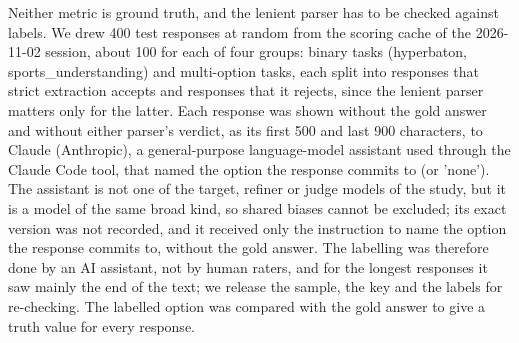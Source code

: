 \documentclass{ieeeaccess}
\begin{document}
Neither metric is ground truth, and the lenient parser has to be checked against labels. We drew 400 test responses at random from the scoring cache of the 2026-11-02 session, about 100 for each of four groups: binary tasks (hyperbaton, sports\_\allowbreak{}understanding) and multi-option tasks, each split into responses that strict extraction accepts and responses that it rejects, since the lenient parser matters only for the latter. Each response was shown without the gold answer and without either parser's verdict, as its first 500 and last 900 characters, to Claude (Anthropic), a general-purpose language-model assistant used through the Claude Code tool, that named the option the response commits to (or 'none'). The assistant is not one of the target, refiner or judge models of the study, but it is a model of the same broad kind, so shared biases cannot be excluded; its exact version was not recorded, and it received only the instruction to name the option the response commits to, without the gold answer. The labelling was therefore done by an AI assistant, not by human raters, and for the longest responses it saw mainly the end of the text; we release the sample, the key and the labels for re-checking. The labelled option was compared with the gold answer to give a truth value for every response.
\end{document}
